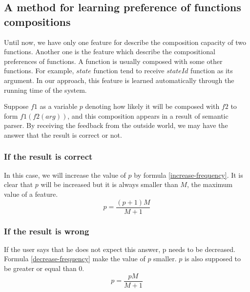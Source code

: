 \subsection{A method for learning preference of functions compositions}
Until now, we have only one feature for describe the composition capacity of two functions. Another one is the feature which describe the compositional preferences of functions. A function is usually composed with some other functions. For example, $state$ function tend to receive $stateId$ function as its argument. In our approach, this feature is learned automatically through the running time of the system. 

Suppose $f1$ as a variable $p$ denoting how likely it will be composed with $f2$ to form $f1(f2(arg))$, and this composition appears in a result of semantic parser. By receiving the feedback from the outside world, we may have the answer that the result is correct or not.
\subsubsection*{If the result is correct}
In this case, we will increase the value of $p$ by formula \ref{increase-frequency}. It is clear that $p$ will be increased but it is always smaller than $M$, the maximum value of a feature.
\begin{equation}
\label{increase-frequency}
p = \frac{(p + 1)M}{M+1}
\end{equation}

\subsubsection*{If the result is wrong}
If the user says that he does not expect this answer, p needs to be decreased. Formula \ref{decrease-frequency} make the value of $p$ smaller. $p$ is also supposed to be greater or equal than $0$. 
\begin{equation}
\label{decrease-frequency}
p = \frac{p M}{M+1}
\end{equation}